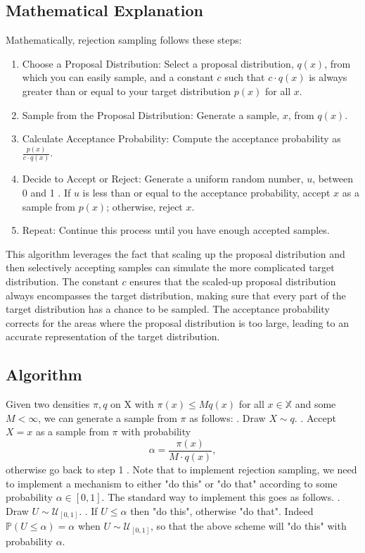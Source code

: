 \documentclass{article}
\begin{document}
\subsection{Mathematical Explanation}
Mathematically, rejection sampling follows these steps:
\begin{enumerate}
    \item Choose a Proposal Distribution: Select a proposal distribution, $q(x)$, from which you can easily sample, and a constant $c$ such that $c \cdot q(x)$ is always greater than or equal to your target distribution $p(x)$ for all $x$.
    \item Sample from the Proposal Distribution: Generate a sample, $x$, from $q(x)$.
    \item  Calculate Acceptance Probability: Compute the acceptance probability as $\frac{p(x)}{c \cdot q(x)}$.
    \item Decide to Accept or Reject: Generate a uniform random number, $u$, between 0 and 1 . If $u$ is less than or equal to the acceptance probability, accept $x$ as a sample from $p(x)$; otherwise, reject $x$.
    \item  Repeat: Continue this process until you have enough accepted samples.
\end{enumerate}

This algorithm leverages the fact that scaling up the proposal distribution and then selectively accepting samples can simulate the more complicated target distribution. The constant $c$ ensures that the scaled-up proposal distribution always encompasses the target distribution, making sure that every part of the target distribution has a chance to be sampled. The acceptance probability corrects for the areas where the proposal distribution is too large, leading to an accurate representation of the target distribution.

\subsection{Algorithm}

Given two densities $\pi, q$ on $\mathrm{X}$ with $\pi(x) \leq M q(x)$ for all $x \in \mathbb{X}$ and some $M<\infty$, we can generate a sample from $\pi$ as follows:
. Draw $X \sim q$.
. Accept $X=x$ as a sample from $\pi$ with probability
$$
\alpha=\frac{\pi(x)}{M \cdot q(x)},
$$
otherwise go back to step 1 .
\newline
Note that to implement rejection sampling, we need to implement a mechanism to either "do this" or "do that" according to some probability $\alpha \in[0,1]$. The standard way to implement this goes as follows.\newline
{}. Draw $U \sim \mathcal{U}_{[0,1]}$. . If $U \leq \alpha$ then "do this", otherwise "do that".
\newline
Indeed $\mathbb{P}(U \leq \alpha)=\alpha$ when $U \sim \mathcal{U}_{[0,1]}$, so that the above scheme will "do this" with probability $\alpha$.
\end{document}

